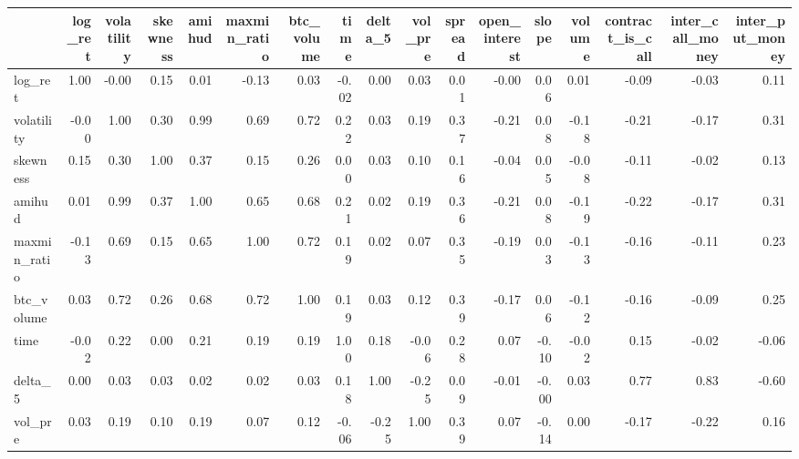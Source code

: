 \begin{tabular}{lrrrrrrrrrrrrrrrr}
\toprule
{} &  log\_ret &  volatility &  skewness &  amihud &  maxmin\_ratio &  btc\_volume &  time &  delta\_5 &  vol\_pre &  spread &  open\_interest &  slope &  volume &  contract\_is\_call &  inter\_call\_money &  inter\_put\_money \\
\midrule
log\_ret          &     1.00 &       -0.00 &      0.15 &    0.01 &         -0.13 &        0.03 & -0.02 &     0.00 &     0.03 &    0.01 &          -0.00 &   0.06 &    0.01 &             -0.09 &             -0.03 &             0.11 \\
volatility       &    -0.00 &        1.00 &      0.30 &    0.99 &          0.69 &        0.72 &  0.22 &     0.03 &     0.19 &    0.37 &          -0.21 &   0.08 &   -0.18 &             -0.21 &             -0.17 &             0.31 \\
skewness         &     0.15 &        0.30 &      1.00 &    0.37 &          0.15 &        0.26 &  0.00 &     0.03 &     0.10 &    0.16 &          -0.04 &   0.05 &   -0.08 &             -0.11 &             -0.02 &             0.13 \\
amihud           &     0.01 &        0.99 &      0.37 &    1.00 &          0.65 &        0.68 &  0.21 &     0.02 &     0.19 &    0.36 &          -0.21 &   0.08 &   -0.19 &             -0.22 &             -0.17 &             0.31 \\
maxmin\_ratio     &    -0.13 &        0.69 &      0.15 &    0.65 &          1.00 &        0.72 &  0.19 &     0.02 &     0.07 &    0.35 &          -0.19 &   0.03 &   -0.13 &             -0.16 &             -0.11 &             0.23 \\
btc\_volume       &     0.03 &        0.72 &      0.26 &    0.68 &          0.72 &        1.00 &  0.19 &     0.03 &     0.12 &    0.39 &          -0.17 &   0.06 &   -0.12 &             -0.16 &             -0.09 &             0.25 \\
time             &    -0.02 &        0.22 &      0.00 &    0.21 &          0.19 &        0.19 &  1.00 &     0.18 &    -0.06 &    0.28 &           0.07 &  -0.10 &   -0.02 &              0.15 &             -0.02 &            -0.06 \\
delta\_5          &     0.00 &        0.03 &      0.03 &    0.02 &          0.02 &        0.03 &  0.18 &     1.00 &    -0.25 &    0.09 &          -0.01 &  -0.00 &    0.03 &              0.77 &              0.83 &            -0.60 \\
vol\_pre          &     0.03 &        0.19 &      0.10 &    0.19 &          0.07 &        0.12 & -0.06 &    -0.25 &     1.00 &    0.39 &           0.07 &  -0.14 &    0.00 &             -0.17 &             -0.22 &             0.16 \\

\end{tabular}
